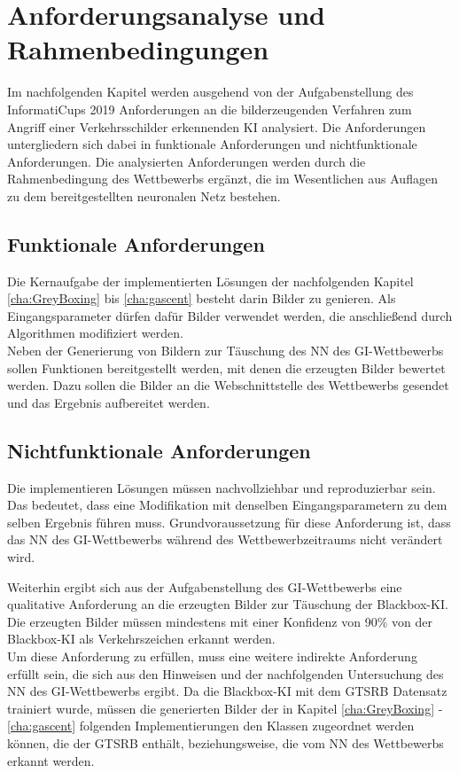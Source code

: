 \chapter{Anforderungsanalyse und Rahmenbedingungen}
\label{cha:AnfAnalyse}
Im nachfolgenden Kapitel werden ausgehend von der Aufgabenstellung des InformatiCups 2019 Anforderungen an die bilderzeugenden Verfahren zum Angriff einer Verkehrsschilder erkennenden \ac{KI} analysiert. 
Die Anforderungen untergliedern sich dabei in funktionale Anforderungen und nichtfunktionale Anforderungen. 
Die analysierten Anforderungen werden durch die Rahmenbedingung des Wettbewerbs ergänzt, die im Wesentlichen aus Auflagen zu dem bereitgestellten neuronalen Netz bestehen.

\section{Funktionale Anforderungen}
Die Kernaufgabe der implementierten Lösungen der nachfolgenden Kapitel \ref{cha:GreyBoxing} bis \ref{cha:gascent} besteht darin Bilder zu genieren. 
Als Eingangsparameter dürfen dafür Bilder verwendet werden, die anschließend durch Algorithmen modifiziert werden.\\
Neben der Generierung von Bildern zur Täuschung des \ac{NN} des \ac{GI}-Wettbewerbs sollen Funktionen bereitgestellt werden, mit denen die erzeugten Bilder bewertet werden. 
Dazu sollen die Bilder an die Webschnittstelle des Wettbewerbs gesendet und das Ergebnis aufbereitet werden.

\section{Nichtfunktionale Anforderungen}
Die implementieren Lösungen müssen nachvollziehbar und reproduzierbar sein. 
Das bedeutet, dass eine Modifikation mit denselben Eingangsparametern zu dem selben Ergebnis führen muss. 
Grundvoraussetzung für diese Anforderung ist, dass das \ac{NN} des \ac{GI}-Wettbewerbs während des Wettbewerbzeitraums nicht verändert wird.

Weiterhin ergibt sich aus der Aufgabenstellung des \ac{GI}-Wettbewerbs eine qualitative Anforderung an die erzeugten Bilder zur Täuschung der Blackbox-\ac{KI}. 
Die erzeugten Bilder müssen mindestens mit einer Konfidenz von 90\% von der Blackbox-\ac{KI} als Verkehrszeichen erkannt werden. \cite{gesellschaft_fur_informatik_e.v._informaticup2019-irrbilder.pdf_2018} \\
Um diese Anforderung zu erfüllen, muss eine weitere indirekte Anforderung erfüllt sein, die sich aus den Hinweisen und der nachfolgenden Untersuchung des \ac{NN} des \ac{GI}-Wettbewerbs ergibt. 
Da die Blackbox-\ac{KI} mit dem \ac{GTSRB} Datensatz trainiert wurde, müssen die generierten Bilder der in Kapitel \ref{cha:GreyBoxing} - \ref{cha:gascent} folgenden Implementierungen den Klassen zugeordnet werden können, die der \ac{GTSRB} enthält, beziehungsweise, die vom \ac{NN} des Wettbewerbs erkannt werden. 

